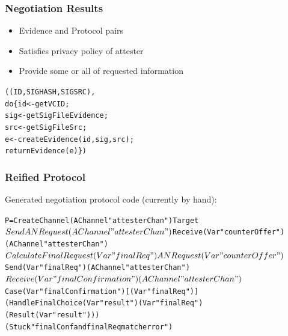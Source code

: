 \documentclass{beamer}
\begin{document}
\begin{frame}[fragile]
  \frametitle{Negotiation Results}

  \begin{itemize}
  \item Evidence and Protocol pairs
  \item Satisfies privacy policy of attester
  \item Provide some or all of requested information
  \end{itemize}

  \begin{alltt}
   ((ID,SIGHASH,SIGSRC),
    do \{ id <- getVCID;
         sig <- getSigFileEvidence;
         src <- getSigFileSrc;
         e <- createEvidence(id,sig,src);
         returnEvidence(e) \})
  \end{alltt}


\end{frame}

\begin{frame}[fragile]
  \frametitle{Reified Protocol}

  Generated negotiation protocol code (currently by hand):

  \begin{small}
  \begin{alltt}
P = CreateChannel (AChannel "attesterChan") Target	      
    $ Send ANRequest (AChannel "attesterChan")
    $ Receive (Var "counterOffer") (AChannel "attesterChan")
    $ CalculateFinalRequest (Var "finalReq")
                            ANRequest
                            (Var "counterOffer")
    $ Send (Var "finalReq") (AChannel "attesterChan")
    $ Receive (Var "finalConfirmation")
              (AChannel "attesterChan")
    $ Case (Var "finalConfirmation") [(Var "finalReq")]
           (HandleFinalChoice (Var "result") (Var "finalReq")
           (Result (Var "result")))
           (Stuck "finalConf and finalReq match error")
  \end{alltt}
  \end{small}
\end{frame}
\end{document}
